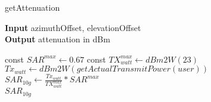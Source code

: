 

\begin{algorithm}
	\caption{getAttenuation} 
	\label{alg:getAttenuation}
     \hspace*{\algorithmicindent} \textbf{Input} azimuthOffset, elevationOffset \\
     \hspace*{\algorithmicindent} \textbf{Output} attenuation in dBm
	\begin{algorithmic}[1]
		\State  const $SAR^{max} \gets 0.67$
		\State  const $TX^{max}_{watt} \gets dBm2W(23)$
		\vspace{4 mm}
		\State $Tx_{watt} \gets dBm2W(getActualTransmitPower(user)) $		
		\State $ SAR_{10g} \gets \frac{Tx_{watt}}{TX^{max}_{watt}} * SAR^{max}$ \\
		\Return $ SAR_{10g}$
	\end{algorithmic} 
\end{algorithm}
